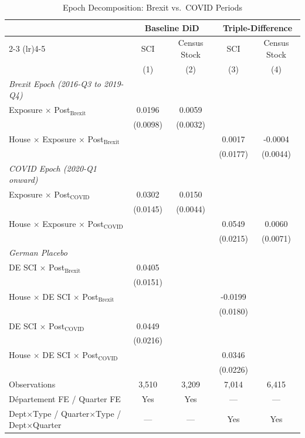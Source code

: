 \begin{table}[htbp]
\centering
\caption{Epoch Decomposition: Brexit vs.\ COVID Periods}
\label{tab:epoch}
\begin{threeparttable}
\begin{tabular}{lcccc}
\toprule
 & \multicolumn{2}{c}{Baseline DiD} & \multicolumn{2}{c}{Triple-Difference} \\
\cmidrule(lr){2-3} \cmidrule(lr){4-5}
 & SCI & Census Stock & SCI & Census Stock \\
 & (1) & (2) & (3) & (4) \\
\midrule
\textit{Brexit Epoch (2016-Q3 to 2019-Q4)} & & & & \\
\quad Exposure $\times$ Post$_{\text{Brexit}}$ & 0.0196 & 0.0059 & & \\
 & (0.0098) & (0.0032) & & \\
\quad House $\times$ Exposure $\times$ Post$_{\text{Brexit}}$ & & & 0.0017 & -0.0004 \\
 & & & (0.0177) & (0.0044) \\
\textit{COVID Epoch (2020-Q1 onward)} & & & & \\
\quad Exposure $\times$ Post$_{\text{COVID}}$ & 0.0302 & 0.0150 & & \\
 & (0.0145) & (0.0044) & & \\
\quad House $\times$ Exposure $\times$ Post$_{\text{COVID}}$ & & & 0.0549 & 0.0060 \\
 & & & (0.0215) & (0.0071) \\
\midrule
\textit{German Placebo} & & & & \\
\quad DE SCI $\times$ Post$_{\text{Brexit}}$ & 0.0405 & & & \\
 & (0.0151) & & & \\
\quad House $\times$ DE SCI $\times$ Post$_{\text{Brexit}}$ & & & -0.0199 & \\
 & & & (0.0180) & \\
\quad DE SCI $\times$ Post$_{\text{COVID}}$ & 0.0449 & & & \\
 & (0.0216) & & & \\
\quad House $\times$ DE SCI $\times$ Post$_{\text{COVID}}$ & & & 0.0346 & \\
 & & & (0.0226) & \\
\midrule
Observations & 3,510 & 3,209 & 7,014 & 6,415 \\
D\'epartement FE / Quarter FE & Yes & Yes & --- & --- \\
Dept$\times$Type / Quarter$\times$Type / Dept$\times$Quarter & --- & --- & Yes & Yes \\

\end{tabular}
\end{threeparttable}
\end{table}
